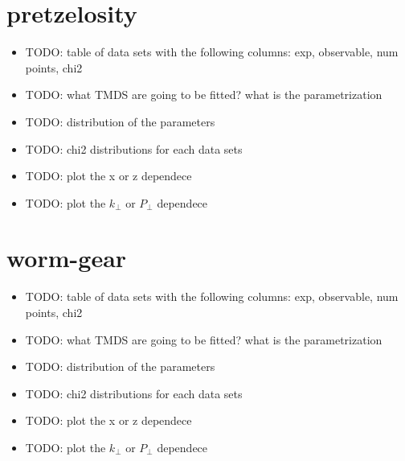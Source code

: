 \documentclass[floatfix,aps,prd,nofootinbib,superscriptaddress,preprint]{revtex4}
\newcommand\3[1]{\boldsymbol{#1}}
\begin{document}
\newpage
\section{pretzelosity}

\begin{itemize}
\item {\color{red} TODO: table of data sets with the following columns: exp, observable, num points, chi2 }
\item {\color{red} TODO: what TMDS are going to be fitted? what is the parametrization}
\item {\color{red} TODO: distribution of the parameters}
\item {\color{red} TODO: chi2 distributions for each data sets}
\item {\color{red} TODO: plot the x or z dependece}
\item {\color{red} TODO: plot the $k_{\perp}$ or $P_{\perp}$ dependece}
\end{itemize}

\newpage
\section{worm-gear}

\begin{itemize}
\item {\color{red} TODO: table of data sets with the following columns: exp, observable, num points, chi2 }
\item {\color{red} TODO: what TMDS are going to be fitted? what is the parametrization}
\item {\color{red} TODO: distribution of the parameters}
\item {\color{red} TODO: chi2 distributions for each data sets}
\item {\color{red} TODO: plot the x or z dependece}
\item {\color{red} TODO: plot the $k_{\perp}$ or $P_{\perp}$ dependece}
\end{itemize}
\end{document}
